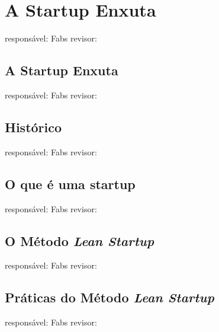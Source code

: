 \section{A Startup Enxuta}
responsável: Fabs revisor:

\subsection{A Startup Enxuta}
responsável: Fabs revisor:

\subsection{Histórico}
responsável: Fabs revisor:

\subsection{O que é uma startup}
responsável: Fabs revisor:

\subsection{O Método \emph{Lean Startup}}
responsável: Fabs revisor:

\subsection{Práticas do Método \emph{Lean Startup}}
responsável: Fabs revisor:
